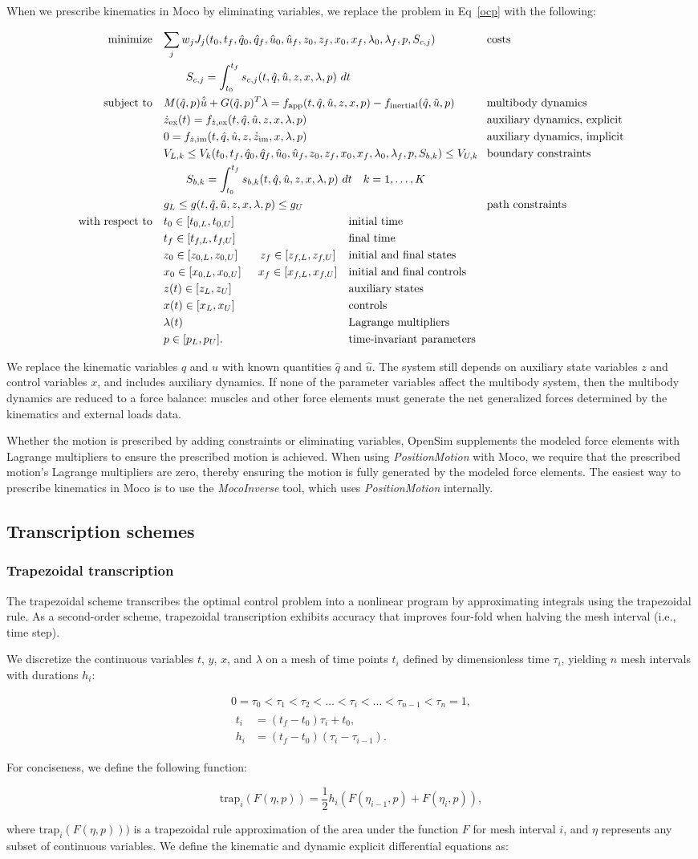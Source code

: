 \documentclass[10pt,letterpaper]{article}
\newcommand{\prescribed}{
\begin{adjustwidth}{-1.125in}{-1.125in} %
\begin{align}
    \begin{aligned}
        \mbox{minimize} \quad & \mathrlap{\sum_j w_j J_{j}(t_0, t_f, \hat{q}_0, \hat{q}_f, \hat{u}_0, \hat{u}_f, z_0, z_f, x_{0}, x_{f}, \lambda_0, \lambda_f, p, S_{c,j})} &&&& \textrm{costs} \\
        & \quad\quad \mathrlap{S_{c,j} = \int_{t_0}^{t_f} s_{c,j}(t, \hat{q}, \hat{u}, z, x, \lambda, p)~dt} \\
        \mbox{subject to} \quad &
         M(\hat{q}, p)\hat{\dot{u}} + \mathrlap{G(\hat{q}, p)^T \lambda = f_{\textrm{app}}(t, \hat{q}, \hat{u}, z, x, p) - f_{\textrm{inertial}}(\hat{q}, \hat{u}, p)} &&&& \textrm{multibody dynamics} \\
        & \mathrlap{\dot{z}_{\textrm{ex}}(t) = f_{\dot{z},\textrm{ex}}(t, \hat{q}, \hat{u}, z, x, \lambda, p)} &&&& \textrm{auxiliary dynamics, explicit} \\
        & \mathrlap{0 = f_{\dot{z},\textrm{im}}(t, \hat{q}, \hat{u}, z, \dot{z}_\textrm{im}, x, \lambda, p)} &&&& \textrm{auxiliary dynamics, implicit}\\
        & V_{L,k} \leq V_k(t_0, t_f, \hat{q}_0, \mathrlap{\hat{q}_f, \hat{u}_0, \hat{u}_f, z_0, z_f, x_{0}, x_{f}, \lambda_0, \lambda_f, p, S_{b,k}) \leq V_{U,k}}  &&&& \textrm{boundary constraints} \\
        & \quad\quad \mathrlap{S_{b,k} = \int_{t_0}^{t_f} s_{b,k}(t, \hat{q}, \hat{u}, z, x, \lambda, p)~dt \quad k = 1, \ldots, K} \\
        & \mathrlap{g_{L} \leq g(t, \hat{q}, \hat{u}, z, x, \lambda, p) \leq g_{U}} &&&& \textrm{path constraints} \\
        \mbox{with respect to} \quad
        & t_0 \in [t_{0,L}, t_{0,U}] && \textrm{initial time} \\
        & t_f \in [t_{f,L}, t_{f,U}] && \textrm{final time} \\
        & z_0 \in [z_{0,L}, z_{0,U}] \quad\quad z_f \in [z_{f,L}, z_{f,U}] && \textrm{initial and final states} \\
        & x_0 \in [x_{0,L}, x_{0,U}] \quad\mkern9mu x_f \in [x_{f,L}, x_{f,U}] && \textrm{initial and final controls} \\
        & z(t) \in [z_{L}, z_{U}] && \textrm{auxiliary states} \\
        & x(t) \in [x_{L}, x_{U}] && \textrm{controls} \\
        & \lambda(t) && \textrm{Lagrange multipliers} \\
        & p \in [p_{L}, p_{U}]. && \textrm{time-invariant parameters}
    \end{aligned}
\end{align}
\end{adjustwidth}
}
\newcommand{\traptau}{
\begin{equation}
    \begin{gathered}
        0 = \tau_0 < \tau_1 < \tau_2 < \ldots < \tau_i < \ldots < \tau_{n - 1} < \tau_n = 1, \\
        \begin{aligned}
        t_i &= (t_f - t_0) \tau_i + t_0, \\
        h_i &= (t_f - t_0)(\tau_i - \tau_{i-1}).
        \end{aligned}
    \end{gathered}
\end{equation}
}
\newcommand{\trapfunc}{
\begin{equation}
    \textrm{trap}_i(F(\eta, p)) = \frac{1}{2} h_i (F(\eta_{i-1}, p) + F(\eta_i, p)),
\end{equation}
}
\begin{document}
When we prescribe kinematics in Moco by eliminating variables, we replace the problem in Eq~\ref{ocp} with the following:

\prescribed

We replace the kinematic variables $q$ and $u$ with known quantities $\hat{q}$ and $\hat{u}$. The system still depends on auxiliary state variables $z$ and control variables $x$, and includes auxiliary dynamics. If none of the parameter variables affect the multibody system, then the multibody dynamics are reduced to a force balance: muscles and other force elements must generate the net generalized forces determined by the kinematics and external loads data.

Whether the motion is prescribed by adding constraints or eliminating variables, OpenSim supplements the modeled force elements with Lagrange multipliers to ensure the prescribed motion is achieved. When using \textit{PositionMotion} with Moco, we require that the prescribed motion's Lagrange multipliers are zero, thereby ensuring the motion is fully generated by the modeled force elements. The easiest way to prescribe kinematics in Moco is to use the \textit{MocoInverse} tool, which uses \textit{PositionMotion} internally.

\subsection*{Transcription schemes}

\subsubsection*{Trapezoidal transcription}

The trapezoidal scheme transcribes the optimal control problem into a nonlinear program by approximating integrals using the trapezoidal rule. As a second-order scheme, trapezoidal transcription exhibits accuracy that improves four-fold when halving the mesh interval (i.e., time step).

We discretize the continuous variables $t$, $y$, $x$, and $\lambda$ on a mesh of time points $t_i$ defined by dimensionless time $\tau_i$, yielding $n$ mesh intervals with durations $h_i$:

\traptau

For conciseness, we define the following function:

\trapfunc

\noindent 
where $\mathrm{trap}_i(F(\eta, p)))$ is a trapezoidal rule approximation of the area under the function $F$ for mesh interval $i$, and $\eta$ represents any subset of continuous variables. We define the kinematic and dynamic explicit differential equations as:
\end{document}
